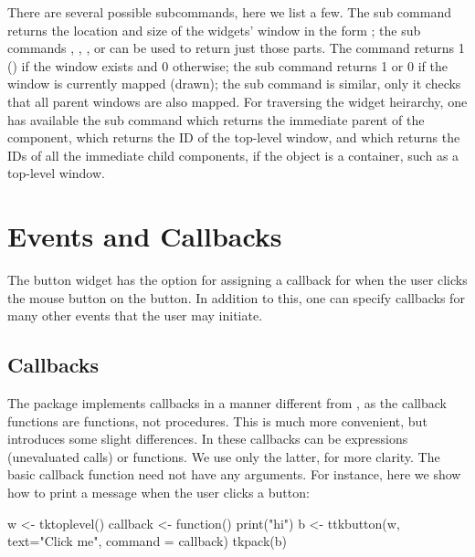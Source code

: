 There are several possible subcommands, here we list a few. The
 sub command returns the location and
size of the widgets' window in the form ;
the sub commands ,
, , or
 can be used to return just those parts. The
 command returns 1 () if the
window exists and 0 otherwise; the  sub
command returns 1 or 0 if the window is currently mapped (drawn); the
 sub command is similar, only it checks
that all parent windows are also mapped.  For traversing the widget
heirarchy, one has available the  sub
command which returns the immediate parent of the component,
 which returns the ID of the top-level
window, and  which returns the IDs of
all the immediate child components, if the object is a container, such
as a top-level window.



\section{Events and Callbacks}
\label{sec:tcltk:overview:events-callbacks}

The button widget has the  option for assigning a
callback for when the user clicks the mouse button on the button. In
addition to this, one can specify callbacks for many other events that
the user may initiate.


\subsection{Callbacks}
\label{sec:tcltk:callbacks}

The  package implements callbacks in a manner different
from \TK, as the callback functions are \R\/ functions, not \TK\/
procedures. This is much more convenient, but introduces some slight
differences.  In  these callbacks can be expressions
(unevaluated calls) or functions. We use only the latter, for more
clarity. The basic callback function need not have any arguments. For
instance, here we show how to print a message when the user clicks a
button:
\begin{Schunk}
\begin{Sinput}
 w <- tktoplevel()
 callback <- function() print("hi")
 b <- ttkbutton(w, text="Click me", command = callback)
  tkpack(b)
\end{Sinput}
\end{Schunk}


